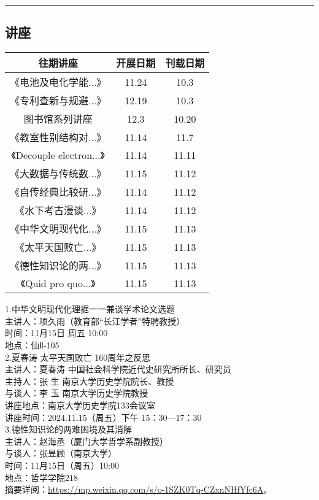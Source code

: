 \documentclass[letterpaper, 12pt]{article}
\begin{document}
\hrule
\pagebreak
\begin{multicols}{2}

\section{讲座}
\begin{tabular}{|c|c|c|}
    \hline
    往期讲座 & 开展日期 & 刊载日期\\
    \hline\hline
    《电池及电化学能...》 & 11.24 & 10.3\\
    《专利查新与规避...》 & 12.19 & 10.3\\
    图书馆系列讲座 & 12.3 & 10.20\\
    《教室性别结构对...》 & 11.14 & 11.7\\
    《Decouple electron...》 & 11.14 & 11.11\\
    《大数据与传统数...》 & 11.15 & 11.12\\
    《自传经典比较研...》 & 11.14 & 11.12\\
    《水下考古漫谈...》 & 11.14 & 11.12\\
    《中华文明现代化...》 & 11.15 & 11.13\\
    《太平天国败亡...》& 11.15 & 11.13\\
    《德性知识论的两...》 & 11.15 & 11.13\\
    《Quid pro quo...》 & 11.15 & 11.13\\
    \hline
\end{tabular}

1.中华文明现代化理据一一兼谈学术论文选题\\
主讲人：项久雨（教育部“长江学者”特聘教授）\\
时间：11月15日 周五 10:00\\
地点：仙Ⅱ-105\\

2.夏春涛 太平天国败亡 160周年之反思\\
主讲人：夏春涛 中国社会科学院近代史研究所所长、研究员\\
主持人：张  生 南京大学历史学院院长、教授\\
与谈人：李  玉 南京大学历史学院教授\\
讲座地点：南京大学历史学院133会议室\\
讲座时间：2024.11.15（周五）下午 15：30—17：30\\

3.德性知识论的两难困境及其消解\\
主讲人：赵海丞（厦门大学哲学系副教授）\\
与谈人：张昱顾（南京大学）\\
时间：11月15日（周五）10:00\\
地点：哲学学院218\\
摘要详阅：\url{https://mp.weixin.qq.com/s/o-1SZK0Tq-CZxnNHfYfc6A}。\\


\end{multicols}
\end{document}

